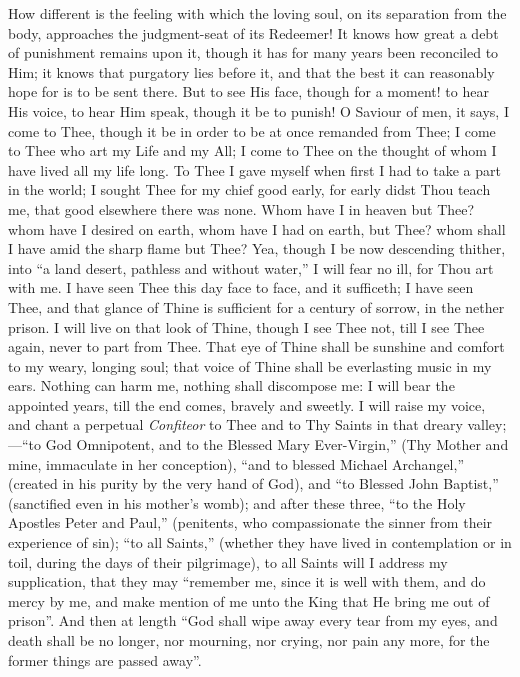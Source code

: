 How different is the feeling with which the loving soul, on its
separation from the body, approaches the judgment-seat of its
Redeemer! It knows how great a debt of punishment remains upon it,
though it has for many years been reconciled to Him; it knows that
purgatory lies before it, and that the best it can reasonably hope for
is to be sent there. But to see His face, though for a moment! to hear
His voice, to hear Him speak, though it be to punish! O Saviour of
men, it says, I come to Thee, though it be in order to be at once
remanded from Thee; I come to Thee who art my Life and my All; I come
to Thee on the thought of whom I have lived all my life long. To Thee
I gave myself when first I had to take a part in the world; I sought
Thee for my chief good early, for early didst Thou teach me, that good
elsewhere there was none. Whom have I in heaven but Thee? whom have I
desired on earth, whom have I had on earth, but Thee? whom shall I
have amid the sharp flame but Thee? Yea, though I be now descending
thither, into ``a land desert, pathless and without water,'' I
will fear no ill, for Thou art with me. I have seen Thee this day face
to face, and it sufficeth; I have seen Thee, and that glance of Thine
is sufficient for a century of sorrow, in the nether prison. I will
live on that look of Thine, though I see Thee not, till I see Thee
again, never to part from Thee. That eye of Thine shall be sunshine
and comfort to my weary, longing soul; that voice of Thine shall be
everlasting music in my ears. Nothing can harm me, nothing shall
discompose me: I will bear the appointed years, till the end comes,
bravely and sweetly. I will raise my voice, and chant a perpetual \emph{Confiteor}
to Thee and to Thy Saints in that dreary valley;—``to God
Omnipotent, and to the Blessed Mary Ever-Virgin,'' (Thy Mother and
mine, immaculate in her conception), ``and to blessed Michael
Archangel,'' (created in his purity by the very hand of God), and
``to Blessed John Baptist,'' (sanctified even in his mother's
womb); and after these three, ``to the Holy Apostles Peter and
Paul,'' (penitents, who compassionate the sinner from their
experience of sin); ``to all Saints,'' (whether they have
lived in contemplation or in toil, during the days of their
pilgrimage), to all Saints will I address my supplication, that they
may ``remember me, since it is well with them, and do mercy by me,
and make mention of me unto the King that He bring me out of
prison''. And then at length ``God shall wipe away every tear
from my eyes, and death shall be no longer, nor mourning, nor crying,
nor pain any more, for the former things are passed away''.

